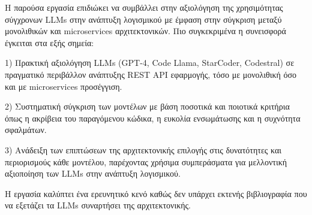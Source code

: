 Η παρούσα εργασία επιδιώκει να συμβάλλει στην αξιολόγηση της χρησιμότητας σύγχρονων LLMs στην ανάπτυξη λογισμικού με έμφαση στην σύγκριση μεταξύ μονολιθικών και microservices αρχιτεκτονικών.
Πιο συγκεκριμένα η συνεισφορά έγκειται στα εξής σημεία:

1) Πρακτική αξιολόγηση LLMs (GPT-4, Code Llama, StarCoder, Codestral) σε πραγματικό περιβάλλον ανάπτυξης REST API εφαρμογής, τόσο με μονολιθική όσο και με microservices προσέγγιση.

2) Συστηματική σύγκριση των μοντέλων με βάση ποσοτικά και ποιοτικά κριτήρια όπως η ακρίβεια του παραγόμενου κώδικα, η ευκολία ενσωμάτωσης και η συχνότητα σφαλμάτων.

3) Ανάδειξη των επιπτώσεων της αρχιτεκτονικής επιλογής στις δυνατότητες και περιορισμούς κάθε μοντέλου, παρέχοντας χρήσιμα συμπεράσματα για μελλοντική αξιοποίηση των LLMs στην ανάπτυξη λογισμικού.

Η εργασία καλύπτει ένα ερευνητικό κενό καθώς δεν υπάρχει εκτενής βιβλιογραφία που να εξετάζει τα LLMs συναρτήσει της αρχιτεκτονικής.

